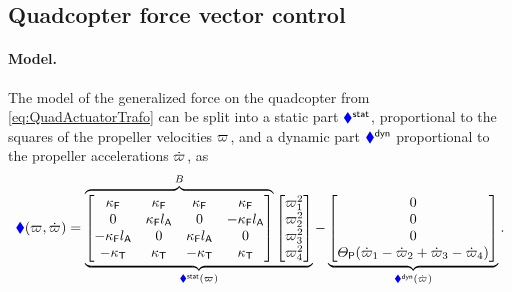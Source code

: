 \subsection{Quadcopter force vector control}
\paragraph{Model.}
The model of the generalized force on the quadcopter from \eqref{eq:QuadActuatorTrafo} can be split into a static part $\genForceQuadStat$, proportional to the squares of the propeller velocities $\PropVel$, and a dynamic part $\genForceQuadDyn$ proportional to the propeller accelerations $\PropVeld$, as
\begin{align}\label{eq:QuadForceVelctorModel}
 \genForceQuad(\PropVel, \PropVeld)
 =
 \underbrace{
 \overbrace{\begin{bmatrix}
  \kappaF & \kappaF & \kappaF & \kappaF \\
  0 & \kappaF\ArmRadius & 0 & -\kappaF\ArmRadius \\
  -\kappaF\ArmRadius & 0 & \kappaF\ArmRadius & 0 \\
  -\kappaT & \kappaT & -\kappaT & \kappaT \\
 \end{bmatrix}}^{B}
 \begin{bmatrix} \PropVel[1]^2 \\ \PropVel[2]^2 \\ \PropVel[3]^2 \\ \PropVel[4]^2 \end{bmatrix}
 }_{\genForceQuadStat(\PropVel)}
 -
 \underbrace{\begin{bmatrix} 0 \\ 0 \\ 0 \\ \JP (\PropVeld[1] - \PropVeld[2] + \PropVeld[3] - \PropVeld[4]) \end{bmatrix}}_{\genForceQuadDyn(\PropVeld)}
 .
\end{align}

